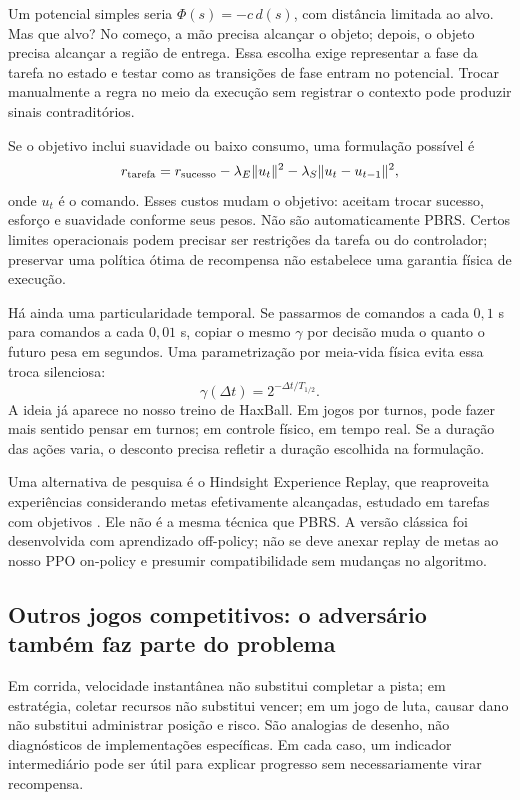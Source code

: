 \documentclass[11pt,a4paper]{article}
\begin{document}
Um potencial simples seria $\Phi(s)=-c\,d(s)$, com distância limitada ao alvo. Mas que alvo? No começo, a mão precisa alcançar o objeto; depois, o objeto precisa alcançar a região de entrega. Essa escolha exige representar a fase da tarefa no estado e testar como as transições de fase entram no potencial. Trocar manualmente a regra no meio da execução sem registrar o contexto pode produzir sinais contraditórios.

Se o objetivo inclui suavidade ou baixo consumo, uma formulação possível é
\begin{equation}
 r_{\rm tarefa}=r_{\rm sucesso}-\lambda_E\|u_t\|^2
 -\lambda_S\|u_t-u_{t-1}\|^2,
\end{equation}
onde $u_t$ é o comando. Esses custos mudam o objetivo: aceitam trocar sucesso, esforço e suavidade conforme seus pesos. Não são automaticamente PBRS. Certos limites operacionais podem precisar ser restrições da tarefa ou do controlador; preservar uma política ótima de recompensa não estabelece uma garantia física de execução.

Há ainda uma particularidade temporal. Se passarmos de comandos a cada $0{,}1$ s para comandos a cada $0{,}01$ s, copiar o mesmo $\gamma$ por decisão muda o quanto o futuro pesa em segundos. Uma parametrização por meia-vida física evita essa troca silenciosa:
\begin{equation}
 \gamma(\Delta t)=2^{-\Delta t/T_{1/2}}.
\end{equation}
A ideia já aparece no nosso treino de HaxBall. Em jogos por turnos, pode fazer mais sentido pensar em turnos; em controle físico, em tempo real. Se a duração das ações varia, o desconto precisa refletir a duração escolhida na formulação.

Uma alternativa de pesquisa é o Hindsight Experience Replay, que reaproveita experiências considerando metas efetivamente alcançadas, estudado em tarefas com objetivos \cite{andrychowicz2017}. Ele não é a mesma técnica que PBRS. A versão clássica foi desenvolvida com aprendizado off-policy; não se deve anexar replay de metas ao nosso PPO on-policy e presumir compatibilidade sem mudanças no algoritmo.

\subsection{Outros jogos competitivos: o adversário também faz parte do problema}
Em corrida, velocidade instantânea não substitui completar a pista; em estratégia, coletar recursos não substitui vencer; em um jogo de luta, causar dano não substitui administrar posição e risco. São analogias de desenho, não diagnósticos de implementações específicas. Em cada caso, um indicador intermediário pode ser útil para explicar progresso sem necessariamente virar recompensa.
\end{document}
